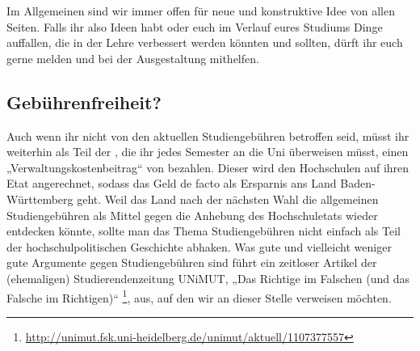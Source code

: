 Im Allgemeinen sind wir immer offen für neue und konstruktive Idee von allen Seiten. Falls ihr also Ideen habt oder euch im Verlauf eures Studiums Dinge auffallen, die in der Lehre verbessert werden könnten und sollten, dürft ihr euch gerne melden und bei der Ausgestaltung mithelfen.

\subsection{Gebührenfreiheit?}
Auch wenn ihr nicht von den aktuellen Studiengebühren betroffen seid, müsst ihr weiterhin als Teil der \EUR{\beitragssumme}, die ihr jedes Semester an die Uni überweisen müsst, einen „Verwaltungskostenbeitrag“ von \EUR{\verwaltungsbetrag} bezahlen. Dieser wird den Hochschulen auf ihren Etat angerechnet, sodass das Geld de facto als Ersparnis ans Land Baden-Württemberg geht. Weil das Land nach der nächsten Wahl die allgemeinen Studiengebühren als Mittel gegen die Anhebung des Hochschuletats wieder entdecken könnte, sollte man das Thema Studiengebühren nicht einfach als Teil der hochschulpolitischen Geschichte abhaken. Was gute und vielleicht weniger gute Argumente gegen Studiengebühren sind führt ein zeitloser Artikel der (ehemaligen) Studierendenzeitung UNiMUT, „Das Richtige im Falschen (und das Falsche im Richtigen)“  \footnote{\url{http://unimut.fsk.uni-heidelberg.de/unimut/aktuell/1107377557}}, aus, auf den wir an dieser Stelle verweisen möchten.




